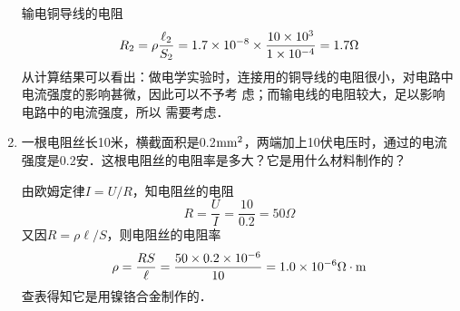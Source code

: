 \begin{enumerate}
\begin{solution}
输电铜导线的电阻
\[R_2=\rho\frac{\ell_2}{S_2}=1.7\times 10^{-8}\times \frac{10\times 10^{3}}{1\times 10^{-4}}=1.7\Omega\]
从计算结果可以看出：做电学实验时，连接用的铜导线的电阻很小，对电路中电流强度的影响甚微，因此可以不予考
虑；而输电线的电阻较大，足以影响电路中的电流强度，所以
需要考虑．
    \end{solution}
    
    \item 一根电阻丝长10米，横截面积是0.2${\rm mm}^2$，两端加上10伏电压时，通过的电流强度是0.2安．这根电阻丝的电阻率是多大？它是用什么材料制作的？

    \begin{solution}
由欧姆定律$I=U/R$，知电阻丝的电阻
\[R=\frac{U}{I}=\frac{10}{0.2}=50\Omega\]
又因$R=\rho\ell/S$，则电阻丝的电阻率
\[\rho=\frac{RS}{\ell}=\frac{50\times0.2\times10^{-6}}{10}=1.0\times 10^{-6}\Omega\cdot {\rm m}\]
查表得知它是用镍铬合金制作的．
    \end{solution}
    
\end{enumerate}



